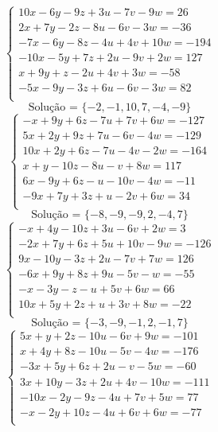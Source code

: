 \documentclass[12pt,oneside,a4paper]{article}
\begin{document}
\vspace{\baselineskip}
\begin{equation*}
\begin{cases}
10x-6y-9z+3u-7v-9w=26 \\
2x+7y-2z-8u-6v-3w=-36 \\
-7x-6y-8z-4u+4v+10w=-194 \\
-10x-5y+7z+2u-9v+2w=127 \\
x+9y+z-2u+4v+3w=-58 \\
-5x-9y-3z+6u-6v-3w=82 \\
\end{cases}
\end{equation*}
\begin{equation*}
\text{Solução = }\{-2,-1,10,7,-4,-9\}
\end{equation*}
\vspace{\baselineskip}
\begin{equation*}
\begin{cases}
-x+9y+6z-7u+7v+6w=-127 \\
5x+2y+9z+7u-6v-4w=-129 \\
10x+2y+6z-7u-4v-2w=-164 \\
x+y-10z-8u-v+8w=117 \\
6x-9y+6z-u-10v-4w=-11 \\
-9x+7y+3z+u-2v+6w=34 \\
\end{cases}
\end{equation*}
\begin{equation*}
\text{Solução = }\{-8,-9,-9,2,-4,7\}
\end{equation*}
\vspace{\baselineskip}
\begin{equation*}
\begin{cases}
-x+4y-10z+3u-6v+2w=3 \\
-2x+7y+6z+5u+10v-9w=-126 \\
9x-10y-3z+2u-7v+7w=126 \\
-6x+9y+8z+9u-5v-w=-55 \\
-x-3y-z-u+5v+6w=66 \\
10x+5y+2z+u+3v+8w=-22 \\
\end{cases}
\end{equation*}
\begin{equation*}
\text{Solução = }\{-3,-9,-1,2,-1,7\}
\end{equation*}
\vspace{\baselineskip}
\begin{equation*}
\begin{cases}
5x+y+2z-10u-6v+9w=-101 \\
x+4y+8z-10u-5v-4w=-176 \\
-3x+5y+6z+2u-v-5w=-60 \\
3x+10y-3z+2u+4v-10w=-111 \\
-10x-2y-9z-4u+7v+5w=77 \\
-x-2y+10z-4u+6v+6w=-77 \\
\end{cases}
\end{equation*}
\end{document}
